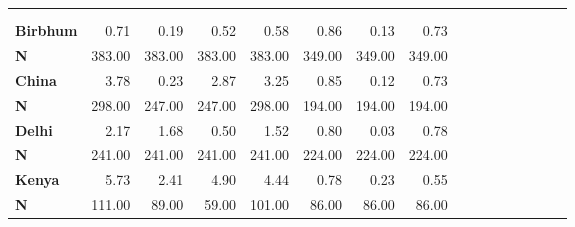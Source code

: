 \begin{tabular}{@{\extracolsep{5pt}}lrrrrrrrrrrrrrrr}
\toprule
&  &  &  &  &  &  &  \\
{\bf } &  &  &  &  &  &  &  \\
\hline
{\bf Birbhum} & 0.71\phantom{***} & 0.19\phantom{***} & 0.52\phantom{***} & 0.58\phantom{***} & 0.86\phantom{***} & 0.13\phantom{***} & 0.73\phantom{***} \\
{\bf N} & 383.00\phantom{***} & 383.00\phantom{***} & 383.00\phantom{***} & 383.00\phantom{***} & 349.00\phantom{***} & 349.00\phantom{***} & 349.00\phantom{***} \\
{\bf China} & 3.78\phantom{***} & 0.23\phantom{***} & 2.87\phantom{***} & 3.25\phantom{***} & 0.85\phantom{***} & 0.12\phantom{***} & 0.73\phantom{***} \\
{\bf N} & 298.00\phantom{***} & 247.00\phantom{***} & 247.00\phantom{***} & 298.00\phantom{***} & 194.00\phantom{***} & 194.00\phantom{***} & 194.00\phantom{***} \\
{\bf Delhi} & 2.17\phantom{***} & 1.68\phantom{***} & 0.50\phantom{***} & 1.52\phantom{***} & 0.80\phantom{***} & 0.03\phantom{***} & 0.78\phantom{***} \\
{\bf N} & 241.00\phantom{***} & 241.00\phantom{***} & 241.00\phantom{***} & 241.00\phantom{***} & 224.00\phantom{***} & 224.00\phantom{***} & 224.00\phantom{***} \\
{\bf Kenya} & 5.73\phantom{***} & 2.41\phantom{***} & 4.90\phantom{***} & 4.44\phantom{***} & 0.78\phantom{***} & 0.23\phantom{***} & 0.55\phantom{***} \\
{\bf N} & 111.00\phantom{***} & 89.00\phantom{***} & 59.00\phantom{***} & 101.00\phantom{***} & 86.00\phantom{***} & 86.00\phantom{***} & 86.00\phantom{***} \\

\end{tabular}
